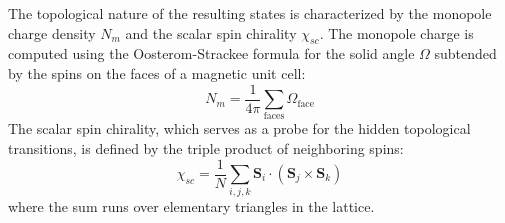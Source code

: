 The topological nature of the resulting states is characterized by the monopole charge density $N_m$ and the scalar spin chirality $\chi_{sc}$. The monopole charge is computed using the Oosterom-Strackee formula for the solid angle $\Omega$ subtended by the spins on the faces of a magnetic unit cell:
\begin{equation}
    N_m = \frac{1}{4\pi} \sum_{\text{faces}} \Omega_{\text{face}}
\end{equation}
The scalar spin chirality, which serves as a probe for the hidden topological transitions, is defined by the triple product of neighboring spins:
\begin{equation}
    \chi_{sc} = \frac{1}{N} \sum_{i,j,k} \mathbf{S}_i \cdot (\mathbf{S}_j \times \mathbf{S}_k)
\end{equation}
where the sum runs over elementary triangles in the lattice.
